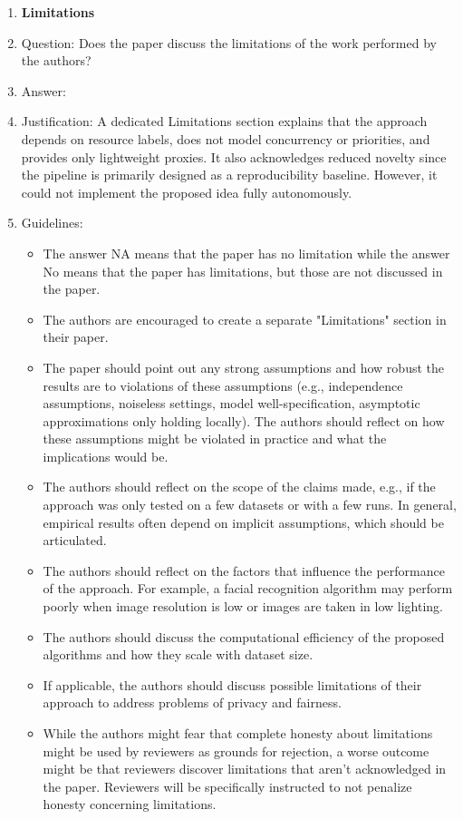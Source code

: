 \documentclass{article}
\theoremstyle{plain}
\theoremstyle{definition}
\theoremstyle{remark}
\begin{document}
\begin{enumerate}
		\item {\bf Limitations}
		\item[] Question: Does the paper discuss the limitations of the work performed by the authors?
		\item[] Answer: \answerYes{}
		\item[] Justification: A dedicated Limitations section explains that the approach depends on resource labels, does not model concurrency or priorities, and provides only lightweight proxies. It also acknowledges reduced novelty since the pipeline is primarily designed as a reproducibility baseline. However, it could not implement the proposed idea fully autonomously.
		\item[] Guidelines:
		\begin{itemize}
			\item The answer NA means that the paper has no limitation while the answer No means that the paper has limitations, but those are not discussed in the paper. 
			\item The authors are encouraged to create a separate "Limitations" section in their paper.
			\item The paper should point out any strong assumptions and how robust the results are to violations of these assumptions (e.g., independence assumptions, noiseless settings, model well-specification, asymptotic approximations only holding locally). The authors should reflect on how these assumptions might be violated in practice and what the implications would be.
			\item The authors should reflect on the scope of the claims made, e.g., if the approach was only tested on a few datasets or with a few runs. In general, empirical results often depend on implicit assumptions, which should be articulated.
			\item The authors should reflect on the factors that influence the performance of the approach. For example, a facial recognition algorithm may perform poorly when image resolution is low or images are taken in low lighting. 
			\item The authors should discuss the computational efficiency of the proposed algorithms and how they scale with dataset size.
			\item If applicable, the authors should discuss possible limitations of their approach to address problems of privacy and fairness.
			\item While the authors might fear that complete honesty about limitations might be used by reviewers as grounds for rejection, a worse outcome might be that reviewers discover limitations that aren't acknowledged in the paper. Reviewers will be specifically instructed to not penalize honesty concerning limitations.
		\end{itemize}
		

\end{enumerate}
\end{document}
